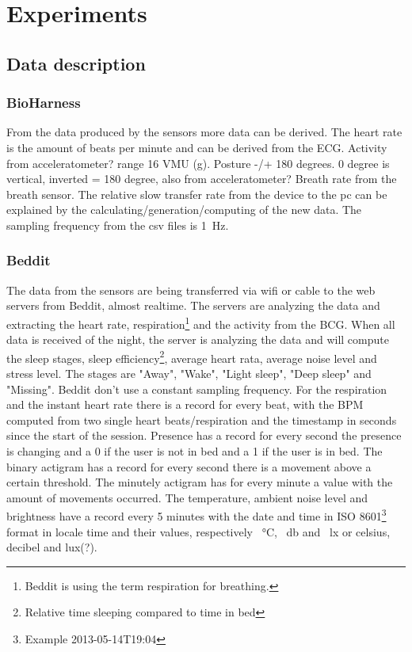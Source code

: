 \section{Experiments}
	\subsection{Data description}
		\subsubsection{BioHarness}
			From the data produced by the sensors more data can be derived. The heart rate is the amount of beats per minute and can be derived from the ECG.  
			Activity from acceleratometer? range 16 VMU (g).
			Posture -/+ 180 degrees. 0 degree is vertical, inverted = 180 degree, also from acceleratometer?
			Breath rate from the breath sensor. 
			The relative slow transfer rate from the device to the pc can be explained by the calculating/generation/computing of the new data.
			The sampling frequency from the csv files is \SI{1}{\hertz}.
		\subsubsection{Beddit}
			The data from the sensors are being transferred via wifi or cable to the web servers from Beddit, almost realtime. The servers are analyzing the data and extracting the heart rate, respiration\footnote{Beddit is using the term respiration for breathing.} and the activity from the BCG. When all data is received of the night, the server is analyzing the data and will compute the sleep stages, sleep efficiency\footnote{Relative time sleeping compared to time in bed}, average heart rata, average noise level and stress level. The stages are "Away", "Wake", "Light sleep", "Deep sleep" and "Missing". Beddit don't use a constant sampling frequency. For the respiration and the instant heart rate there is a record for every beat, with the BPM computed from two single heart beats/respiration and the timestamp in seconds since the start of the session. Presence has a record for every second the presence is changing and a 0 if the user is not in bed and a 1 if the user is in bed. The binary actigram has a record for every second there is a movement above a certain threshold. The minutely actigram has for every minute a value with the amount of movements occurred. The temperature, ambient noise level and brightness have a record every 5 minutes with the date and time in ISO 8601\footnote{Example 2013-05-14T19:04\cite{iso8601}} format in locale time and their values, respectively \SI{}{\celsius}, \SI{}{\decibel} and \SI{}{\lux} or celsius, decibel and lux(?).

